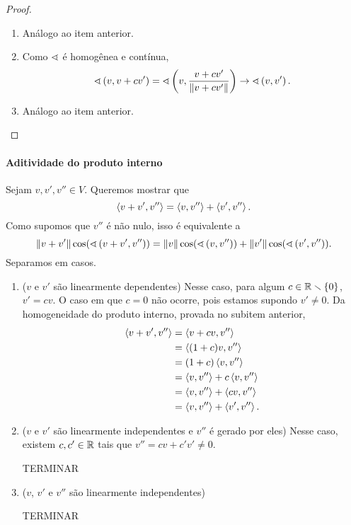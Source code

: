 \begin{proof}
\begin{enumerate}
		\item Análogo ao item anterior.

		\item Como $\sphericalangle$ é homogênea e contínua,
				\begin{equation*}
					\sphericalangle\left({v},{v+cv'}\right) = \sphericalangle\left({v},{\frac{v+cv'}{\left\Vert{v+cv'}\right\Vert}}\right) \rightarrow \sphericalangle\left({v},{v'}\right).
				\end{equation*}

		\item Análogo ao item anterior.
	\end{enumerate}
\end{proof}

\paragraph{Aditividade do produto interno} Sejam $v,v',v'' \in V$. Queremos mostrar que
					\begin{equation*}
						\left\langle{v+v'},{v''}\right\rangle = \left\langle{v},{v''}\right\rangle + \left\langle{v'},{v''}\right\rangle.
					\end{equation*}
				Como supomos que $v''$ é não nulo, isso é equivalente a
					\begin{equation*}
						\left\Vert{v+v'}\right\Vert\cos(\sphericalangle\left({v+v'},{v''}\right)) = \left\Vert{v}\right\Vert\cos(\sphericalangle\left({v},{v''}\right)) + \left\Vert{v'}\right\Vert\cos(\sphericalangle\left({v'},{v''}\right)).
					\end{equation*}
				Separamos em casos.
					\begin{enumerate}
						\item ($v$ e $v'$ são linearmente dependentes) Nesse caso, para algum $c \in \mathbb{R} \smallsetminus \{0\}$, $v'=cv$. O caso em que $c=0$ não ocorre, pois estamos supondo $v' \neq 0$. Da homogeneidade do produto interno, provada no subitem anterior,
							\begin{align*}
								\left\langle{v+v'},{v''}\right\rangle &= \left\langle{v+cv},{v''}\right\rangle \\
									&= \left\langle{(1+c)v},{v''}\right\rangle \\
									&= (1+c)\left\langle{v},{v''}\right\rangle \\
									&= \left\langle{v},{v''}\right\rangle + c\left\langle{v},{v''}\right\rangle \\
									&= \left\langle{v},{v''}\right\rangle + \left\langle{cv},{v''}\right\rangle \\
									&= \left\langle{v},{v''}\right\rangle + \left\langle{v'},{v''}\right\rangle.
							\end{align*}

						\item ($v$ e $v'$ são linearmente independentes e $v''$ é gerado por eles) Nesse caso, existem $c,c' \in \mathbb{R}$ tais que $v'' = cv+c'v' \neq 0$.

						TERMINAR

						\item ($v$, $v'$ e $v''$ são linearmente independentes)

						TERMINAR

					\end{enumerate}



